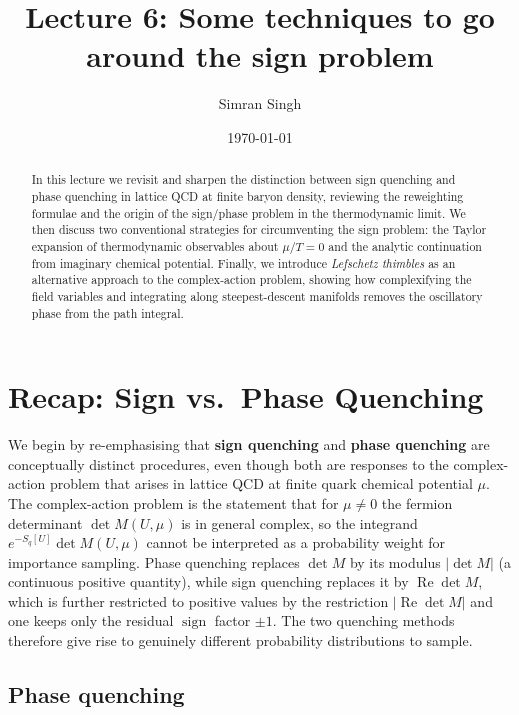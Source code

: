 \documentclass[11pt]{article}
\title{Lecture 6: Some techniques to go around the sign problem}
\author{Simran Singh}
\date{\today}
\theoremstyle{definition}
\begin{document}
\maketitle

\begin{abstract}
In this lecture we revisit and sharpen the distinction between sign quenching
and phase quenching in lattice QCD at finite baryon density, reviewing the
reweighting formulae and the origin of the sign/phase problem in the
thermodynamic limit. We then discuss two conventional strategies for
circumventing the sign problem: the Taylor expansion of thermodynamic
observables about $\mu/T=0$ and the analytic continuation from imaginary
chemical potential. Finally, we introduce \emph{Lefschetz thimbles} as an
alternative approach to the complex-action problem, showing how complexifying the
field variables and integrating along steepest-descent manifolds removes the
oscillatory phase from the path integral.
\end{abstract}


\section{Recap: Sign vs.\ Phase Quenching}


We begin by re-emphasising that \textbf{sign quenching} and \textbf{phase
quenching} are conceptually distinct procedures, even though both are responses
to the complex-action problem that arises in lattice QCD at finite quark
chemical potential $\mu$. The complex-action problem is the statement that for
$\mu\neq 0$ the fermion determinant $\det M(U,\mu)$ is in general complex, so
the integrand $e^{-S_q[U]}\det M(U,\mu)$ cannot be interpreted as a probability
weight for importance sampling. Phase quenching replaces $\det M$ by its
modulus $|\det M|$ (a continuous positive quantity), while sign quenching
replaces it by $\operatorname{Re}\det M$, which is further restricted to positive values by the restriction $|\operatorname{Re}\det M|$ and one keeps only the residual
$\operatorname{sign}$ factor $\pm 1$. The two quenching methods therefore give rise
to genuinely different probability distributions to sample.

\subsection{Phase quenching}
\end{document}
